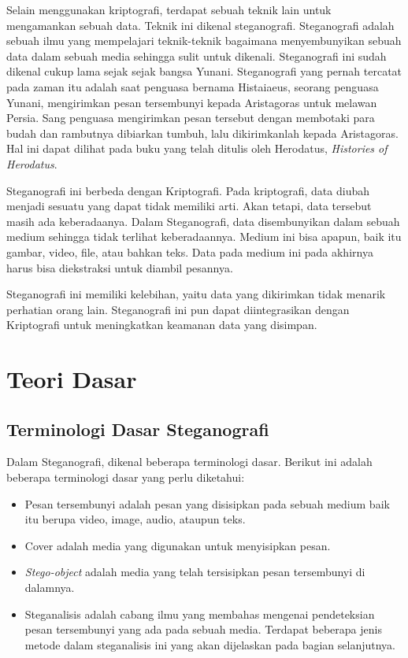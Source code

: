 \documentclass[10pt,conference]{IEEEtran}
\theoremstyle{definition}
\begin{document}
Selain menggunakan kriptografi, terdapat sebuah teknik lain untuk mengamankan sebuah data. Teknik ini dikenal steganografi. 
Steganografi adalah sebuah ilmu yang mempelajari teknik-teknik bagaimana menyembunyikan sebuah data dalam sebuah media sehingga 
sulit untuk dikenali. \cite{b1} Steganografi ini sudah dikenal cukup lama sejak sejak bangsa Yunani. Steganografi yang pernah 
tercatat pada zaman itu adalah saat penguasa bernama Histaiaeus, seorang penguasa Yunani, mengirimkan pesan tersembunyi kepada 
Aristagoras untuk melawan Persia. Sang penguasa mengirimkan pesan tersebut dengan membotaki para budah dan rambutnya dibiarkan tumbuh, 
lalu dikirimkanlah kepada Aristagoras. Hal ini dapat dilihat pada buku yang telah ditulis oleh Herodatus, \emph{Histories of Herodatus}.

Steganografi ini berbeda dengan Kriptografi. Pada kriptografi, data diubah menjadi sesuatu yang dapat tidak memiliki arti. 
Akan tetapi, data tersebut masih ada keberadaanya. Dalam Steganografi, data disembunyikan dalam sebuah medium sehingga tidak terlihat 
keberadaannya. Medium ini bisa apapun, baik itu gambar, video, file, atau bahkan teks. Data pada medium ini pada akhirnya harus bisa 
diekstraksi untuk diambil pesannya.

Steganografi ini memiliki kelebihan, yaitu data yang dikirimkan tidak menarik perhatian orang lain. Steganografi ini pun dapat 
diintegrasikan dengan Kriptografi untuk meningkatkan keamanan data yang disimpan.

\section{Teori Dasar}

\subsection{Terminologi Dasar Steganografi}

Dalam Steganografi, dikenal beberapa terminologi dasar. Berikut ini adalah beberapa terminologi dasar yang perlu diketahui: \cite{b1}

\begin{itemize}
    \item Pesan tersembunyi adalah pesan yang disisipkan pada sebuah medium baik itu berupa video, image, audio, ataupun teks. 
    \item Cover adalah media yang digunakan untuk menyisipkan pesan.
    \item \emph{Stego-object} adalah media yang telah tersisipkan pesan tersembunyi di dalamnya.
    \item Steganalisis adalah cabang ilmu yang membahas mengenai pendeteksian pesan tersembunyi yang ada pada sebuah media. Terdapat 
    beberapa jenis metode dalam steganalisis ini yang akan dijelaskan pada bagian selanjutnya.  
\end{itemize}
\end{document}

